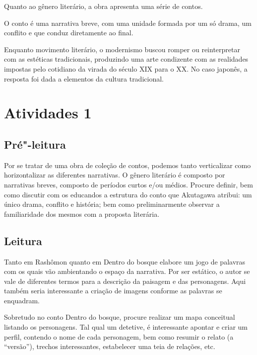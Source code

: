 \documentclass[12pt]{extarticle}
\begin{document}
Quanto ao gênero literário, a obra apresenta uma série de contos.
 
O conto é uma narrativa breve, com uma unidade formada por um só drama, um
conflito e que conduz diretamente ao final.
 
Enquanto movimento literário, o modernismo buscou romper ou reinterpretar com
as estéticas tradicionais, produzindo uma arte condizente com as realidades
impostas pelo cotidiano da virada do século XIX para o XX.
No caso japonês, a resposta foi dada a elementos da cultura tradicional.



\section{Atividades 1}


\subsection{Pré"-leitura}


Por se tratar de uma obra de coleção de contos, podemos
tanto verticalizar como horizontalizar as diferentes narrativas. O
gênero literário é composto por narrativas breves, composto de períodos
curtos e/ou médios. Procure definir, bem como discutir com os educandos
a estrutura do conto que Akutagawa atribui: um único drama, conflito e
história; bem como preliminarmente observar a familiaridade dos mesmos
com a proposta literária.

\subsection{Leitura}


Tanto em Rashômon quanto em Dentro do bosque elabore um jogo
de palavras com os quais vão ambientando o espaço da narrativa. Por ser
estático, o autor se vale de diferentes termos para a descrição da
paisagem e das personagens. Aqui também seria interessante a criação de
imagens conforme as palavras se enquadram.

Sobretudo no conto Dentro do bosque, procure realizar um mapa conceitual
listando os personagens. Tal qual um detetive, é interessante apontar e
criar um perfil, contendo o nome de cada personagem, bem como resumir o
relato (a ``versão''), trechos interessantes, estabelecer uma teia de
relações, etc.
\end{document}
